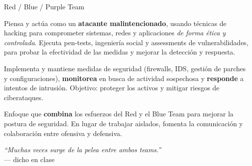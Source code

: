 \documentclass[11pt,a4paper]{article}
\newcommand{\prof}[1]{\par\medskip\noindent\textit{``#1''}\\[-2pt]\hspace*{1em}%
  {\footnotesize\textcolor{black!60}{--- dicho en clase}}\par\medskip\noindent}
\begin{document}
\begin{center}
\end{center}

\begin{defbox}{Red / Blue / Purple Team}
\begin{description}[leftmargin=0pt,labelsep=0.4em,style=nextline,itemsep=2pt]
  \item[Red Team (ofensivo)] Piensa y actúa como un \textbf{atacante malintencionado}, usando
        técnicas de hacking para comprometer sistemas, redes y aplicaciones \emph{de forma
        ética y controlada}. Ejecuta pen-tests, ingeniería social y assessments de
        vulnerabilidades, para probar la efectividad de las medidas y mejorar la detección y
        respuesta.
  \item[Blue Team (defensivo)] Implementa y mantiene medidas de seguridad (firewalls, IDS,
        gestión de parches y configuraciones), \textbf{monitorea} en busca de actividad
        sospechosa y \textbf{responde} a intentos de intrusión. Objetivo: proteger los activos y
        mitigar riesgos de ciberataques.
  \item[Purple Team (colaborativo)] Enfoque que \textbf{combina} los esfuerzos del Red y el Blue
        Team para mejorar la postura de seguridad. En lugar de trabajar aislados, fomenta la
        comunicación y colaboración entre ofensiva y defensiva. \prof{Muchas veces surge de la
        pelea entre ambos teams.}
  \end{description}
\end{defbox}
\end{document}
